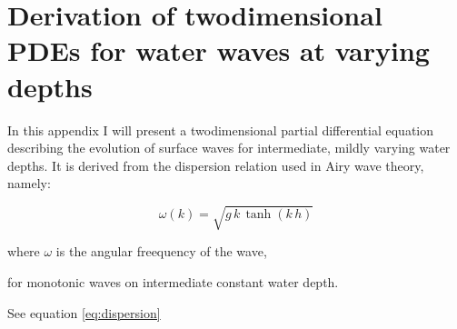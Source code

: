 \chapter{Derivation of twodimensional PDEs for water waves at varying depths}

In this appendix I will present a twodimensional partial differential equation describing the evolution of surface waves for intermediate, mildly varying water depths. It is derived from the dispersion relation used in Airy wave theory, namely:

\begin{equation} \label{eq:dispersion}
\omega(k) = \sqrt{g\,k\,\tanh(k\,h)}
\end{equation}

where \(\omega\) is the angular freequency of the wave, 

for monotonic waves on intermediate constant water depth.

See equation \ref{eq:dispersion}
